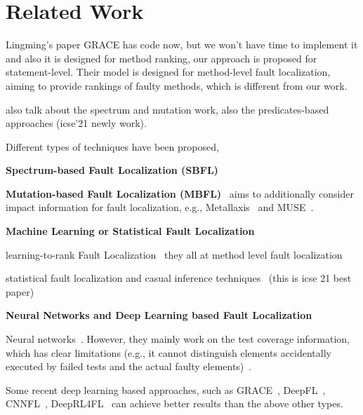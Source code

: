 \section{Related Work}


Lingming's paper GRACE has code now, but we won't have time to implement it and also it is designed for method ranking, our approach is proposed for statement-level. Their model is designed for method-level fault localization, aiming to provide rankings of faulty methods, which is different from our work.

also talk about the spectrum and mutation work, also the predicates-based approaches (icse'21 newly work).



Different types of techniques have been proposed, 

\textbf{Spectrum-based Fault Localization (SBFL)}~\cite{zhang2011localizing, abreu2007accuracy, jones2005empirical, abreu2006evaluation, naish2011model, wong2007effective, liblit2005scalable, lucia2014extended}




\textbf{Mutation-based Fault Localization (MBFL)}~\cite{MUSE, zhang2013injecting, budd1981mutation, zhang2010test, musco2017large} 
aims to additionally consider impact information for fault localization, e.g., Metallaxis~\cite{papadakis2015metallaxis} and MUSE~\cite{MUSE}. 



\textbf{Machine Learning or Statistical Fault Localization}
	
learning-to-rank Fault Localization~\cite{MULTRIC,TraPT,b2016learning,sohn2017fluccs} 
they all at method level fault localization

statistical fault localization
and casual inference techniques~\cite{kuccuk2021improving} (this is icse 21 best paper)




\textbf{Neural Networks and Deep Learning based Fault Localization}

Neural networks~\cite{zheng2016fault, briand2007using, zhang2017deep, wong2009bp}.  However, they mainly work on the test coverage information, which has clear limitations (e.g., it cannot distinguish elements accidentally executed by failed tests and the actual faulty elements)~\cite{TraPT}. 

Some recent deep learning based approaches, such as GRACE~\cite{lou2021boosting}, DeepFL~\cite{DeepFL}, CNNFL~\cite{zhang2019cnn}, DeepRL4FL~\cite{icse21-fl} can achieve better results than the above other types. 


